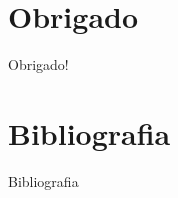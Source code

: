 \documentclass[11pt]{beamer}
\begin{document}
\section*{Obrigado}
\begin{frame}
    \begin{center}
        Obrigado!
    \end{center}
\end{frame}

\section*{Bibliografia}
\begin{frame}{Bibliografia}


\end{frame}
\end{document}
